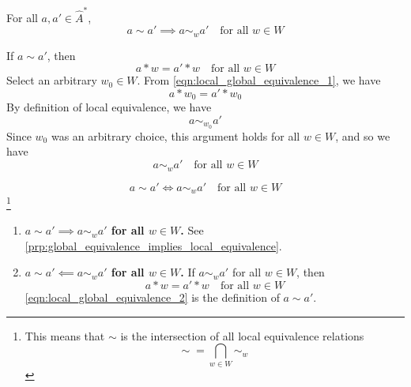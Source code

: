 \begin{propositionE}\label{prp:global_equivalence_implies_local_equivalence}
    For all $a, a' \in \hat{A}^{*}$,
    \begin{equation}
        a \sim a' \implies a \sim_{w} a' \quad \text{for all $w \in W$}
    \end{equation}
\end{propositionE}
\begin{proofE}
    If $a \sim a'$, then
    \begin{equation}
        \label{eqn:local_global_equivalence_1}
        a \ast w = a' \ast w \quad \text{for all $w \in W$}
    \end{equation}
    Select an arbitrary $w_{0} \in W$.
    From \cref{eqn:local_global_equivalence_1}, we have
    \begin{equation}
        a \ast w_{0} = a' \ast w_{0}
    \end{equation}
    By definition of local equivalence, we have
    \begin{equation}
        a \sim_{w_{0}} a'
    \end{equation}
    Since $w_{0}$ was an arbitrary choice, this argument holds for all $w \in W$, and so we have
    \begin{equation}
        a \sim_{w} a' \quad \text{for all $w \in W$}
    \end{equation}
\end{proofE}


\begin{propositionE}\label{prp:gloabal_equivalence_is_local_equivalence_on_all_world_states}
    \begin{equation}
        a \sim a' \iff a \sim_{w} a' \quad \text{for all $w \in W$}
    \end{equation}
    \footnote{
    This means that $\sim$ is the intersection of all local equivalence relations
    \begin{equation}
        \sim \; = \bigcap_{w \in W} \sim_{w}
    \end{equation}
    }
\end{propositionE}
\begin{proofE}
\begin{enumerate}[(1)]
    \item \textbf{$a \sim a' \implies a \sim_{w} a'$ for all $w \in W$.}
    See \cref{prp:global_equivalence_implies_local_equivalence}.

    \item \textbf{$a \sim a' \impliedby a \sim_{w} a'$ for all $w \in W$.}
    If $a \sim_{w} a'$ for all $w \in W$, then
    \begin{equation}
        \label{eqn:local_global_equivalence_2}
        a \ast w = a' \ast w \quad \text{for all $w \in W$}
    \end{equation}
    \cref{eqn:local_global_equivalence_2} is the definition of $a \sim a'$.
\end{enumerate}
\end{proofE}

